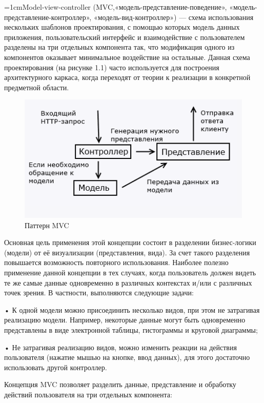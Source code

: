 \documentclass[14pt,a4paper]{extreport}
\begin{document}
	\parindent=1cmModel-view-controller (MVC,«модель-представление-поведение», «модель-представление-контроллер», «модель-вид-контроллер») — схема использования нескольких шаблонов проектирования, с помощью которых модель данных приложения, пользовательский интерфейс и взаимодействие с пользователем разделены на три отдельных компонента так, что модификация одного из компонентов оказывает минимальное воздействие на остальные. Данная схема проектирования (на рисунке 1.1) часто используется для построения архитектурного каркаса, когда переходят от теории к реализации в конкретной предметной области.\par	
	\begin{figure}[h]
	\begin{center}
	\includegraphics[scale=1.2]{mvc}
	\caption{Паттерн MVC}
	\end{center}
	\end{figure}
	Основная цель применения этой концепции состоит в разделении бизнес-логики (модели) от её визуализации (представления, вида). За счет такого разделения повышается возможность повторного использования. Наиболее полезно применение данной концепции в тех случаях, когда пользователь должен видеть те же самые данные одновременно в различных контекстах и/или с различных точек зрения. В частности, выполняются следующие задачи:\par
	• К одной модели можно присоединить несколько видов, при этом не затрагивая реализацию модели. Например, некоторые данные могут быть одновременно представлены в виде электронной таблицы, гистограммы и круговой диаграммы;\par
	• Не затрагивая реализацию видов, можно изменить реакции на действия пользователя (нажатие мышью на кнопке, ввод данных), для этого достаточно использовать другой контроллер.\par
	Концепция MVC позволяет разделить данные, представление и обработку действий пользователя на три отдельных компонента:\par
\end{document}
